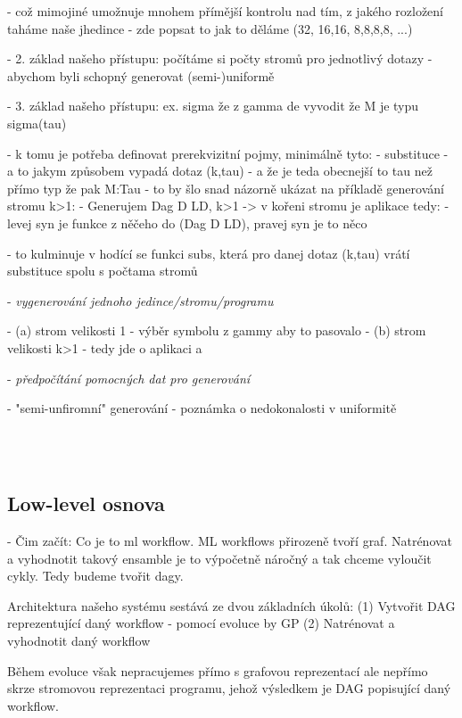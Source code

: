 \documentclass[a4paper,oneside]{memoir}
\begin{document}
  - což mimojiné umožnuje mnohem přímější kontrolu nad tím, z jakého rozložení taháme naše jhedince 
  - zde popsat to jak to děláme (32, 16,16, 8,8,8,8, ...)

- 2. základ našeho přístupu: počítáme si počty stromů pro jednotlivý dotazy 
     - abychom byli schopný generovat (semi-)uniformě

- 3. základ našeho přístupu: ex. sigma že z gamma de vyvodit že M je typu sigma(tau)

  - k tomu je potřeba definovat prerekvizitní pojmy, minimálně tyto:
    - substituce
    - a to jakym způsobem vypadá dotaz (k,tau) - a že je teda obecnejší to tau než přímo typ že pak M:Tau
      - to by šlo snad názorně ukázat na příkladě generování stromu k>1:
      - Generujem Dag D LD, k>1 -> v kořeni stromu je aplikace tedy:
         - levej syn je funkce z něčeho do (Dag D LD), pravej syn je to něco

  - to kulminuje v hodící se funkci subs, která pro danej dotaz (k,tau) vrátí substituce spolu s počtama stromů


- \textit{vygenerování jednoho jedince/stromu/programu}

 - (a) strom velikosti 1 - výběr symbolu z gammy aby to pasovalo
 - (b) strom velikosti k>1 - tedy jde o aplikaci a

- \textit{předpočítání pomocných dat pro generování}


- "semi-unfiromní" generování - poznámka o nedokonalosti v uniformitě

~\\

~\\

\subsection{Low-level osnova}

- Čim začít: 
Co je to ml workflow. 
ML workflows přirozeně tvoří graf. 
Natrénovat a vyhodnotit takový ensamble je to výpočetně náročný a tak chceme vyloučit cykly. 
Tedy budeme tvořit dagy. 

Architektura našeho systému sestává ze dvou základních úkolů:
(1) Vytvořit DAG reprezentující daný workflow - pomocí evoluce by GP
(2) Natrénovat a vyhodnotit daný workflow

Během evoluce však nepracujemes přímo s grafovou reprezentací ale nepřímo skrze stromovou reprezentaci programu, jehož výsledkem je DAG popisující daný workflow.
\end{document}
